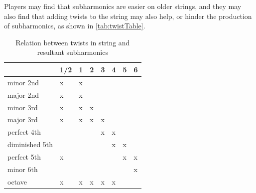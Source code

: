 Players may find that subharmonics are easier on older strings, and they may also find that adding twists to the string may also help, or hinder the production of subharmonics, as shown in \autoref{tab:twistTable}. 

\begin{table}
  \centering
  \caption{Relation between twists in string and resultant subharmonics}
\label{tab:twistTable}
  \begin{tabular}{llllllll} 
  \toprule
  \multicolumn{1}{r}{} & \multicolumn{1}{c}{1/2} & \multicolumn{1}{c}{1} & \multicolumn{1}{c}{2} & \multicolumn{1}{c}{3} & \multicolumn{1}{c}{4} & \multicolumn{1}{c}{5} & \multicolumn{1}{c}{6}  \\ 
  \hline
  minor 2nd            & x                       & x                     &                       &                       &                       &                       &                        \\
  major 2nd            & x                       & x                     &                       &                       &                       &                       &                        \\
  minor 3rd            & x                       & x                     & x                     &                       &                       &                       &                        \\
  major 3rd            & x                       & x                     & x                     & x                     &                       &                       &                        \\
  perfect 4th          &                         &                       &                       & x                     & x                     &                       &                        \\
  diminished 5th       &                         &                       &                       &                       & x                     & x                     &                        \\
  perfect 5th          & x                       &                       &                       &                       &                       & x                     & x                      \\
  minor 6th            &                         &                       &                       &                       &                       &                       & x                      \\
  octave               & x                       & x                     & x                     & x                     & x                     &                       &                        \\
  \bottomrule
  \end{tabular}
  \end{table}\autocite[]{kimuraHowProduceSubharmonics1999}

